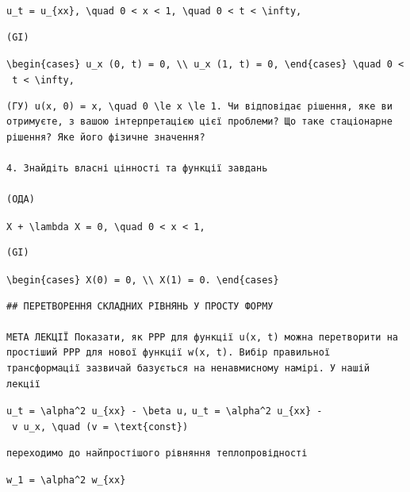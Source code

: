 \documentclass[
  ukrainian,
]{article}
\begin{document}
\texttt{u\_t\ =\ u\_\{xx\},\ \textbackslash{}quad\ 0\ \textless{}\ x\ \textless{}\ 1,\ \textbackslash{}quad\ 0\ \textless{}\ t\ \textless{}\ \textbackslash{}infty,}

\begin{verbatim}
(GI)
\end{verbatim}

\texttt{\textbackslash{}begin\{cases\}\ u\_x\ (0,\ t)\ =\ 0,\ \textbackslash{}\textbackslash{}\ u\_x\ (1,\ t)\ =\ 0,\ \textbackslash{}end\{cases\}\ \textbackslash{}quad\ 0\ \textless{}\ t\ \textless{}\ \textbackslash{}infty,}

\begin{verbatim}
(ГУ) u(x, 0) = x, \quad 0 \le x \le 1. Чи відповідає рішення, яке ви отримуєте, з вашою інтерпретацією цієї проблеми? Що таке стаціонарне рішення? Яке його фізичне значення?

4. Знайдіть власні цінності та функції завдань

(ОДА)
\end{verbatim}

\texttt{X\textquotesingle{}\textquotesingle{}\ +\ \textbackslash{}lambda\ X\ =\ 0,\ \textbackslash{}quad\ 0\ \textless{}\ x\ \textless{}\ 1,}

\begin{verbatim}
(GI)
\end{verbatim}

\texttt{\textbackslash{}begin\{cases\}\ X\textquotesingle{}(0)\ =\ 0,\ \textbackslash{}\textbackslash{}\ X\textquotesingle{}(1)\ =\ 0.\ \textbackslash{}end\{cases\}}

\begin{verbatim}
## ПЕРЕТВОРЕННЯ СКЛАДНИХ РІВНЯНЬ У ПРОСТУ ФОРМУ

МЕТА ЛЕКЦІЇ Показати, як PPP для функції u(x, t) можна перетворити на простіший PPP для нової функції w(x, t). Вибір правильної трансформації зазвичай базується на ненавмисному намірі. У нашій лекції
\end{verbatim}

\texttt{u\_t\ =\ \textbackslash{}alpha\^{}2\ u\_\{xx\}\ -\ \textbackslash{}beta\ u,}
\texttt{u\_t\ =\ \textbackslash{}alpha\^{}2\ u\_\{xx\}\ -\ v\ u\_x,\ \textbackslash{}quad\ (v\ =\ \textbackslash{}text\{const\})}

\begin{verbatim}
переходимо до найпростішого рівняння теплопровідності
\end{verbatim}

\texttt{w\_1\ =\ \textbackslash{}alpha\^{}2\ w\_\{xx\}}
\end{document}
